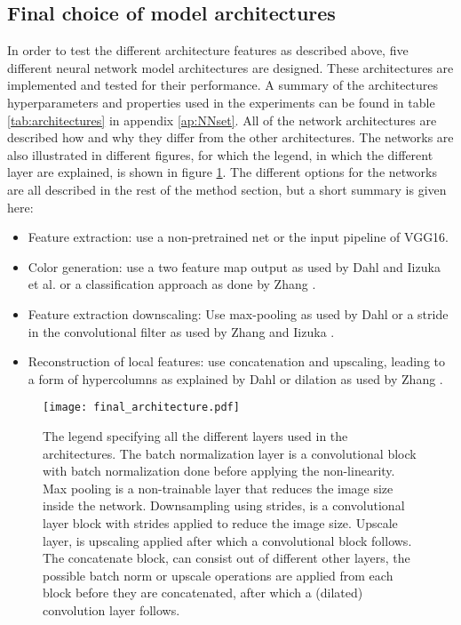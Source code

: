 \subsection{Final choice of model architectures}
In order to test the different architecture features as described above, five different neural network model architectures are designed. These architectures are implemented and tested for their performance. A summary of the architectures hyperparameters and properties used in the experiments can be found in table \ref{tab:architectures} in appendix \ref{ap:NNset}. All of the network architectures are described how and why they differ from the other architectures. The networks are also illustrated in different figures, for which the legend, in which the different layer are explained, is shown in figure \ref{fig:Legend}.
The different options for the networks are all described in the rest of the method section, but a short summary is given here:\\

\begin{itemize}
	\item Feature extraction: use a non-pretrained net or the input pipeline of VGG16.
	\item Color generation: use a two feature map output as used by Dahl \cite{Dahl} and Iizuka et al. \cite{IizukaSIGGRAPH2016} or a classification approach as done by Zhang \cite{Zhang}.
	\item Feature extraction downscaling: Use max-pooling as used by Dahl \cite{Dahl} or a stride in the convolutional filter as used by Zhang and Iizuka \cite{Zhang}\cite{IizukaSIGGRAPH2016}.
	\item Reconstruction of local features: use concatenation and upscaling, leading to a form of hypercolumns as explained by Dahl \cite{Dahl} or dilation as used by Zhang \cite{Zhang}.
\end{itemize}

\begin{figure}[h!]
	\centering
	\texttt{[image: final\_architecture.pdf]}
	\caption{The legend specifying all the different layers used in the architectures. The batch normalization layer is a convolutional block with batch normalization done before applying the non-linearity. Max pooling is a non-trainable layer that reduces the image size inside the network. Downsampling using strides, is a convolutional layer block with strides applied to reduce the image size. Upscale layer, is upscaling applied after which a convolutional block follows. The concatenate block, can consist out of different other layers, the possible batch norm or upscale operations are applied from each block before they are concatenated, after which a (dilated) convolution layer follows.}
	\label{fig:Legend}
\end{figure}

